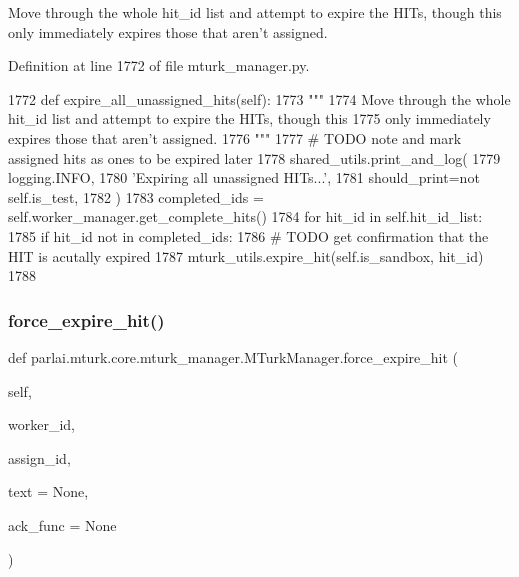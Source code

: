 \begin{DoxyVerb}Move through the whole hit_id list and attempt to expire the HITs, though this
only immediately expires those that aren't assigned.
\end{DoxyVerb}
 

Definition at line 1772 of file mturk\+\_\+manager.\+py.


\begin{DoxyCode}
1772     \textcolor{keyword}{def }expire\_all\_unassigned\_hits(self):
1773         \textcolor{stringliteral}{"""}
1774 \textcolor{stringliteral}{        Move through the whole hit\_id list and attempt to expire the HITs, though this}
1775 \textcolor{stringliteral}{        only immediately expires those that aren't assigned.}
1776 \textcolor{stringliteral}{        """}
1777         \textcolor{comment}{# TODO note and mark assigned hits as ones to be expired later}
1778         shared\_utils.print\_and\_log(
1779             logging.INFO,
1780             \textcolor{stringliteral}{'Expiring all unassigned HITs...'},
1781             should\_print=\textcolor{keywordflow}{not} self.is\_test,
1782         )
1783         completed\_ids = self.worker\_manager.get\_complete\_hits()
1784         \textcolor{keywordflow}{for} hit\_id \textcolor{keywordflow}{in} self.hit\_id\_list:
1785             \textcolor{keywordflow}{if} hit\_id \textcolor{keywordflow}{not} \textcolor{keywordflow}{in} completed\_ids:
1786                 \textcolor{comment}{# TODO get confirmation that the HIT is acutally expired}
1787                 mturk\_utils.expire\_hit(self.is\_sandbox, hit\_id)
1788 
\end{DoxyCode}
\mbox{\label{classparlai_1_1mturk_1_1core_1_1mturk__manager_1_1MTurkManager_aed4375d01be65944318d695adbac88af}} 
\subsubsection{\texorpdfstring{force\+\_\+expire\+\_\+hit()}{force\_expire\_hit()}}
{\footnotesize\ttfamily def parlai.\+mturk.\+core.\+mturk\+\_\+manager.\+M\+Turk\+Manager.\+force\+\_\+expire\+\_\+hit (\begin{DoxyParamCaption}\item[{}]{self,  }\item[{}]{worker\+\_\+id,  }\item[{}]{assign\+\_\+id,  }\item[{}]{text = {\ttfamily None},  }\item[{}]{ack\+\_\+func = {\ttfamily None} }\end{DoxyParamCaption})}

